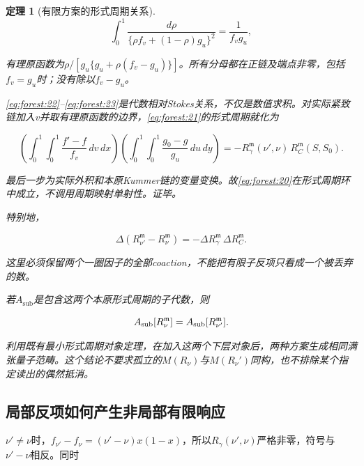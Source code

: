 \documentclass[11pt,a4paper,oneside]{ctexart}
\theoremstyle{cnplain}
\newtheorem{theorem}{定理}[section]
\theoremstyle{definition}
\theoremstyle{remark}
\numberwithin{equation}{section}
\begin{document}
\begin{theorem}[有限方案的形式周期关系]
\begin{equation}
\int_0^1\frac{d\rho}{\{\rho f_v+(1-\rho)g_u\}^2}
       =\frac1{f_vg_u},                                       \label{eq:forest:23}
\end{equation}

有理原函数为\(\rho /[g_u\{g_u+\rho (f_v- g_u)\}]\)。所有分母都在正链及端点非零，包括\(f_v=g_u\)时；没有除以\(f_v- g_u\)。

\eqref{eq:forest:22}--\eqref{eq:forest:23}是代数相对Stokes关系，不仅是数值求积。对实际紧致链加入v并取有理原函数的边界，\eqref{eq:forest:21}的形式周期就化为

\begin{equation}
\left(\int_0^1\!\!\int_0^1\frac{f'-f}{f_v}\,dv\,dx\right)
 \left(\int_0^1\!\!\int_0^1\frac{g_0-g}{g_u}\,du\,dy\right)
       =-R_\gamma^{\mathfrak m}(\nu',\nu)\,
                         R_C^{\mathfrak m}(S,S_0).
\end{equation}

最后一步为实际外积和本原Kummer链的变量变换。故\eqref{eq:forest:20}在形式周期环中成立，不调用周期映射单射性。证毕。

特别地，

\begin{equation}
\Delta(R_{\nu'}^{\mathfrak m}-R_\nu^{\mathfrak m})
       =-\Delta R_\gamma^{\mathfrak m}\,\Delta R_C^{\mathfrak m}.            \label{eq:forest:24}
\end{equation}

这里必须保留两个一圈因子的全部coaction，不能把有限子反项只看成一个被丢弃的数。

若\(A_{\mathrm{sub}}\)是包含这两个本原形式周期的子代数，则

\begin{equation}
A_{\rm sub}[R_\nu^{\mathfrak m}]
        =A_{\rm sub}[R_{\nu'}^{\mathfrak m}].                   \label{eq:forest:25}
\end{equation}

利用既有最小形式周期对象定理，在加入这两个下层对象后，两种方案生成相同满张量子范畴。这个结论不要求孤立的\(M(R_\nu )\)与\(M(R_\nu ')\)同构，也不排除某个指定读出的偶然抵消。

\end{theorem}


\subsection{局部反项如何产生非局部有限响应}\label{sec:forest:7}

\(\nu '\ne \nu \)时，\(f_{\nu '}- f_\nu =(\nu '- \nu )x(1- x)\)，所以\(R_\gamma (\nu ',\nu )\)严格非零，符号与\(\nu '- \nu \)相反。同时
\end{document}
